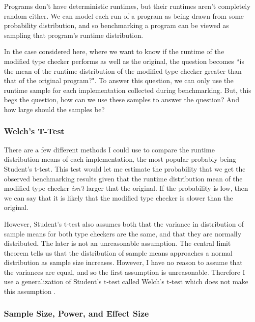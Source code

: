 \documentclass{article}
\begin{document}
Programs don't have deterministic runtimes, but their runtimes aren't completely random either.
We can model each run of a program as being drawn from some probability distribution, and so benchmarking a program can be viewed as sampling that program's runtime distribution.

In the case considered here, where we want to know if the runtime of the modified type checker performs as well as the original, the question becomes ``is the mean of the runtime distribution of the modified type checker greater than that of the original program?".
To answer this question, we can only use the runtime sample for each implementation collected during benchmarking.
But, this begs the question, how can we use these samples to answer the question?
And how large should the samples be?

\subsubsection{Welch's T-Test}

There are a few different methods I could use to compare the runtime distribution means of each implementation, the most popular probably being Student's t-test.
This test would let me estimate the probability that we get the observed benchmarking results given that the runtime distribution mean of the modified type checker \textit{isn't} larger that the original.
If the probability is low, then we can say that it is likely that the modified type checker is slower than the original.

However, Student's t-test also assumes both that the variance in distribution of sample means for both type checkers are the same, and that they are normally distributed.
The later is not an unreasonable assumption.
The central limit theorem tells us that the distribution of sample means approaches a normal distribution as sample size increases.
However, I have no reason to assume that the variances are equal, and so the first assumption is unreasonable.
Therefore I use a generalization of Student's t-test called Welch's t-test which does not make this assumption \citep{Welch1947}.

\newpage

\subsubsection{Sample Size, Power, and Effect Size}
\end{document}
